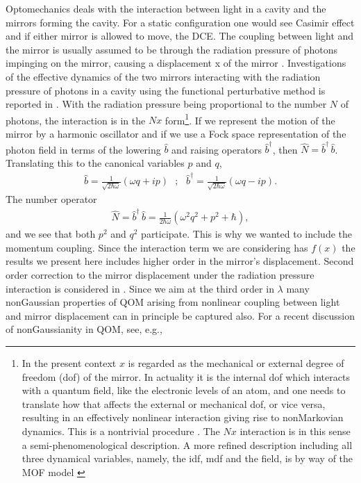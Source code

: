 \documentclass[%
amssymb,preprint,preprintnumbers,nofootinbib,superscriptaddress]{revtex4}
\begin{document}
Optomechanics deals with the interaction between light  in a cavity and the  mirrors forming the cavity. For a static configuration one would see Casimir effect and if either mirror is allowed to move, the DCE. The coupling between light and the mirror is usually assumed to be through the  radiation pressure of photons impinging on the mirror, causing a displacement x  of the mirror \cite{Law}. Investigations of the effective dynamics of the two mirrors interacting with the radiation pressure of photons in a cavity  using the functional perturbative method is reported in \cite{But2M}.  With the radiation pressure being proportional to the number $N$ of photons, the interaction is in the  $N x$ form\footnote{In the present context $x$ is regarded as the mechanical or external degree of freedom (dof) of the mirror. In actuality it is the internal dof which interacts with a quantum field, like the electronic levels of an atom,  and one needs to translate how that affects the external or mechanical dof, or vice versa, resulting in an effectively nonlinear interaction giving rise to nonMarkovian dynamics. This is a nontrivial procedure \cite{BarCal}. The $Nx$ interaction is in this sense a semi-phenomenological description.  A more refined description including all three dynamical variables, namely, the idf, mdf and the field, is by way of the MOF model \cite{GBH,SLH,SLS,ButND}}. If we represent the motion of the mirror by a harmonic oscillator and if we use a Fock space representation of the photon field in terms of the lowering $\hat b$ and raising operators $\hat b^\dagger$, then $\hat N= \hat b^\dagger\, \hat b$. Translating this to the canonical variables  {$p$ and $q$,
\begin{eqnarray}
\hat{b}=\frac{1}{\sqrt{2\hbar\omega}}(\omega q+ip)\ \ \ ;\ \ \
\hat{b}^{\dagger}=\frac{1}{\sqrt{2\hbar\omega}}(\omega q-ip).
\end{eqnarray}
The number operator
\begin{eqnarray}
    \hat{N}=\hat{b}^{\dagger}\,\hat{b}=\frac{1}{2\hbar\omega}(\omega^{2}q^{2}+p^{2}+\hbar),
\end{eqnarray}
and} we see that  both $p^2$ and $q^2$ participate.  This is why we wanted to include the momentum coupling. Since the interaction term we are considering has $f(x)$ the results we present here includes higher order in the mirror's displacement. Second order correction to the mirror displacement under the radiation pressure interaction is considered in \cite{But25}. Since we aim at the third order in $\lambda$ many nonGaussian properties of QOM arising from nonlinear coupling between light and mirror displacement can in principle be captured also. For a recent discussion of nonGaussianity in QOM, see, e.g., \cite{nGQOM} 
\end{document}
